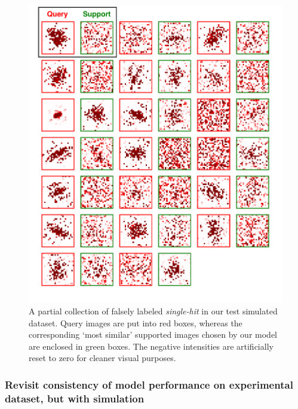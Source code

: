 \begin{figure}
\includegraphics[width=\textwidth,height=0.8\textheight,keepaspectratio]
{figures/false_label.single.simulated.pdf}

\caption{A partial collection of falsely labeled \textit{single-hit} in our test
simulated dataset.  Query images are put into red boxes, whereas the
corresponding `most similar' supported images chosen by our model are enclosed
in green boxes.  The negative intensities are artificially reset to zero for
cleaner visual purposes.  }

\label{fig : false single simulated}
\end{figure}


\subsubsection{Revisit consistency of model performance on experimental dataset,
but with simulation}



